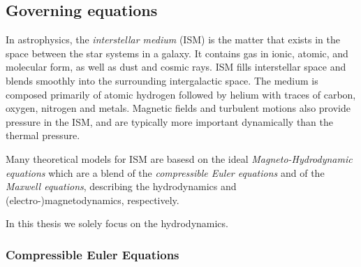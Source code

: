 \subsection{Governing equations}
\label{sec:governing-equations}

In astrophysics, the \emph{interstellar medium} (ISM) is the matter that exists
in the space between the star systems in a galaxy. It contains gas in ionic,
atomic, and molecular form, as well as dust and cosmic rays. ISM fills
interstellar space and blends smoothly into the surrounding intergalactic
space. The medium is composed primarily of atomic hydrogen followed by helium
with traces of carbon, oxygen, nitrogen and metals. Magnetic fields and
turbulent motions also provide pressure in the ISM, and are typically more
important dynamically than the thermal pressure.

Many theoretical models for ISM are basesd on the ideal
\emph{Magneto-Hydrodynamic equations} which are a blend of the \emph{compressible
Euler equations} and of the \emph{Maxwell equations}, describing the hydrodynamics
and (electro-)magnetodynamics, respectively.

In this thesis we solely focus on the hydrodynamics.

\subsubsection{Compressible Euler Equations}

